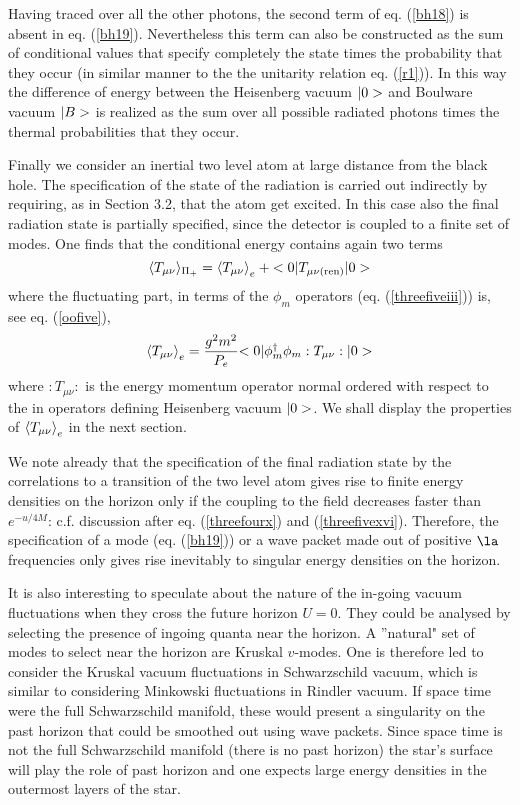 Having traced over all
the other photons, the second term of eq. (\ref{bh18}) is absent in
eq. (\ref{bh19}). Nevertheless this term can also be constructed as the sum of
conditional values that
specify completely the state times the probability that they occur
 (in similar manner to the
 the unitarity relation eq. (\ref{r1})).
 In this way the difference of
energy between the Heisenberg vacuum $\mbox{$ \vert 0 > $}$ and
Boulware vacuum $\mbox{$ \vert B > $}$ is realized as the
sum over all possible radiated photons times the thermal probabilities that
they occur.

Finally we consider  an inertial
two level atom at large distance
from the black hole.
The specification of the state of the radiation is carried out indirectly by
requiring, as in Section 3.2, that the atom get excited.
In this case also the final radiation state is  partially
specified, since the detector is coupled to a finite set of modes.
One finds that the conditional energy contains again two terms
\begin{equation}\langle T_{\mu \nu }\rangle _{ \Pi_+} =
\mbox{$ \langle T_{\mu\nu} \rangle $}_{e} + \mbox{$ \mbox{$ < 0 \vert $} T_{\mu
\nu
({\rm ren})}  \mbox{$ \vert 0 > $} $}
\label{bhTmunu}
\end{equation}
where the fluctuating part, in terms of the $\phi_m$ operators (eq.
(\ref{threefiveiii}))
is, see eq. (\ref{oofive}),
\begin{equation}
\mbox{$ \langle T_{\mu\nu} \rangle $}_{e}
= { g^2 m^2 \over P_{e}}
 \mbox{$ \mbox{$ < 0 \vert $} \phi_m^\dagger \phi_m
:T_{\mu\nu}:  \mbox{$ \vert 0 > $} $}
\label{Tmunue}
\end{equation}
where $:T_{\mu\nu}:$ is the energy momentum operator normal ordered with
respect to the in operators defining Heisenberg vacuum $\mbox{$ \vert 0 > $}$.
We shall display the properties of $\mbox{$ \langle T_{\mu\nu} \rangle $}_{e}$
in the next section.

We note already that the specification of the final radiation state
by the correlations to a transition of the two
level atom
gives rise to finite energy densities on the horizon only
if the coupling to the field decreases faster than $e^{-u/4M}$:
c.f. discussion after eq.
(\ref{threefourx})
and (\ref{threefivexvi}). Therefore, the
specification of a mode (eq. (\ref{bh19})) or a wave packet made out of
positive $\la$ frequencies only gives rise inevitably to
singular energy densities on the horizon.

It is
also
interesting to speculate
about the
nature of the in-going vacuum fluctuations when they cross the future horizon
$U=0$. They could be analysed by
selecting the presence of ingoing quanta near the horizon.
A ''natural" set of
 modes to select near the horizon are Kruskal $v$-modes. One is
therefore led to consider the Kruskal vacuum fluctuations in Schwarzschild
vacuum, which is similar to considering Minkowski fluctuations in Rindler
vacuum. If space time were the full Schwarzschild manifold, these would
present a singularity on the past horizon that could be smoothed out using
wave packets. Since space time is not the full
Schwarzschild manifold (there is no past horizon)
the star's surface
will play the role of past
horizon and one expects large energy densities
in the outermost layers of the star.


